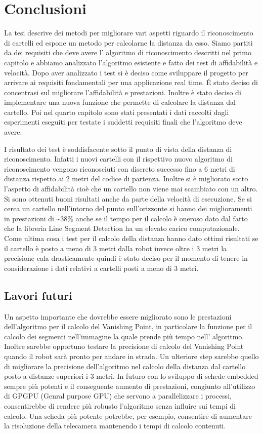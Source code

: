 
\chapter{Conclusioni}

	La tesi descrive dei metodi per migliorare vari aspetti riguardo il riconoscimento di cartelli ed espone un metodo per calcolarne la distanza da esso. Siamo partiti da dei requisiti che deve avere l' algoritmo di riconoscimento descritti nel primo capitolo e abbiamo analizzato l'algoritmo esistente e fatto dei test di affidabilità e velocità. Dopo aver analizzato i test si è deciso come sviluppare il progetto per arrivare ai requisiti fondamentali per una applicazione real time. \'E stato deciso di concentrasi sul migliorare l'affidabilità e prestazioni. Inoltre è stato deciso di implementare una nuova funzione che permette di calcolare la distanza dal cartello. Poi nel quarto capitolo sono stati presentati i dati raccolti dagli esperimenti eseguiti per testate i suddetti requisiti finali che l'algoritmo deve avere.

	I risultato dei test è soddisfacente sotto il punto di vista della distanza di riconoscimento. Infatti i nuovi cartelli con il rispettivo nuovo algoritmo di riconoscimento vengono riconosciuti con discreto successo fino a 6 metri di distanza rispetto ai 2 metri del codice di partenza. Inoltre si è migliorato sotto l'aspetto di affidabilità cioè che un cartello non viene mai scambiato con un altro. Si sono ottenuti buoni risultati anche da parte della velocità di esecuzione. Se si cerca un cartello nell'intorno del punto sull'orizzonte si hanno dei miglioramenti in prestazioni di \textasciitilde $38$\% anche se il tempo per il calcolo è oneroso dato dal fatto che la libreria Line Segment Detection ha un elevato carico computazionale. Come ultima cosa i test per il calcolo della distanza hanno dato ottimi risultati se il cartello è posto a meno di 3 metri dalla robot invece oltre i 3 metri la precisione cala drasticamente quindi è stato deciso per il momento di tenere in considerazione i dati relativi a cartelli posti a meno di 3 metri.

\section{Lavori futuri}

	Un aspetto importante che dovrebbe essere migliorato sono le prestazioni dell'algoritmo per il calcolo del Vanishing Point, in particolare la funzione per il calcolo dei segmenti nell'immagine la quale prende più tempo nell' algoritmo. Inoltre sarebbe opportuno testare la precisione di calcolo del Vanishing Point quando il robot sarà pronto per andare in strada. Un ulteriore step sarebbe quello di migliorare la precisione dell'algoritmo nel calcolo della distanza dal cartello posto a distanze superiori i 3 metri. In futuro con lo sviluppo di schede embedded sempre più potenti e il conseguente aumento di prestazioni, congiunto all'utilizzo di GPGPU (Genral purpose GPU) che servono a parallelizzare i processi, consentirebbe di rendere più robusto l'algoritmo senza influire sui tempi di calcolo. Una scheda più potente potrebbe, per esempio, consentire di aumentare la risoluzione della telecamera mantenendo i tempi di calcolo contenuti.